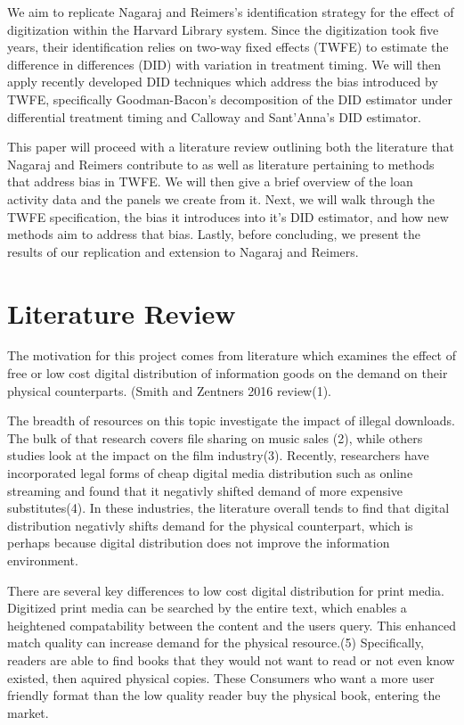 \documentclass{article}
\begin{document}
We aim to replicate Nagaraj and Reimers's identification strategy for the effect of digitization within the Harvard Library system. Since the digitization took five years, their identification relies on two-way fixed effects (TWFE) to estimate the difference in differences (DID) with variation in treatment timing. We will then apply recently developed DID techniques which address the bias introduced by TWFE, specifically Goodman-Bacon's decomposition of the DID estimator under differential treatment timing and Calloway and Sant'Anna's DID estimator. 

This paper will proceed with a literature review outlining both the literature that Nagaraj and Reimers contribute to as well as literature pertaining to methods that address bias in TWFE. We will then give a brief overview of the loan activity data and the panels we create from it. Next, we will walk through the TWFE specification, the bias it introduces into it's DID estimator, and how new methods aim to address that bias. Lastly, before concluding, we present the results of our replication and extension to Nagaraj and Reimers. 

\section{Literature Review}
The motivation for this project comes from literature which examines the effect of free or low cost digital distribution of information goods on the demand on their physical counterparts. (Smith and Zentners 2016 review(1). 

The breadth of resources on this topic investigate the impact of illegal downloads. The bulk of that research covers file sharing on music sales (2), while others studies look at the impact on the film industry(3). Recently, researchers have incorporated legal forms of cheap digital media distribution such as online streaming and found that it negativly shifted demand of more expensive substitutes(4). In these industries, the literature overall tends to find that digital distribution negativly shifts demand for the physical counterpart, which is perhaps because digital distribution does not improve the information environment.

There are several key differences to low cost digital distribution for print media. Digitized print media can be searched by the entire text, which enables a heightened compatability between the content and the users query. This enhanced match quality can increase demand for the physical resource.(5) Specifically, readers are able to find books that they would not want to read or not even know existed, then aquired physical copies. These Consumers who want a more user friendly format than the low quality reader buy the physical book, entering the market.
\end{document}
